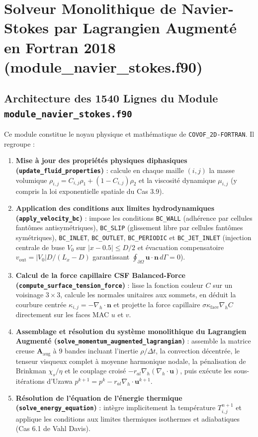 \documentclass[10pt,a4paper,oneside]{book}
\begin{document}
\chapter{Solveur Monolithique de Navier-Stokes par Lagrangien Augmenté en Fortran 2018 (module_navier_stokes.f90)}
\section{Architecture des 1540 Lignes du Module \texttt{module\_navier\_stokes.f90}}
Ce module constitue le noyau physique et mathématique de \texttt{COVOF\_2D-FORTRAN}. Il regroupe :
\begin{enumerate}
  \item \textbf{Mise à jour des propriétés physiques diphasiques (\texttt{update\_fluid\_properties})} : calcule en chaque maille $(i, j)$ la masse volumique $\rho_{i,j} = C_{i,j}\rho_1 + (1-C_{i,j})\rho_2$ et la viscosité dynamique $\mu_{i,j}$ (y compris la loi exponentielle spatiale du Cas 3.9).
  \item \textbf{Application des conditions aux limites hydrodynamiques (\texttt{apply\_velocity\_bc})} : impose les conditions \texttt{BC\_WALL} (adhérence par cellules fantômes antisymétriques), \texttt{BC\_SLIP} (glissement libre par cellules fantômes symétriques), \texttt{BC\_INLET}, \texttt{BC\_OUTLET}, \texttt{BC\_PERIODIC} et \texttt{BC\_JET\_INLET} (injection centrale de buse $V_0$ sur $|x - 0.5| \le D/2$ et évacuation compensatoire $v_{\text{out}} = |V_0| D / (L_x - D)$ garantissant $\oint_{\partial\Omega} \mathbf{u}\cdot\mathbf{n}\,d\Gamma = 0$).
  \item \textbf{Calcul de la force capillaire CSF Balanced-Force (\texttt{compute\_surface\_tension\_force})} : lisse la fonction couleur $C$ sur un voisinage $3\times 3$, calcule les normales unitaires aux sommets, en déduit la courbure centrée $\kappa_{i,j} = -\nabla_h \cdot \mathbf{n}$ et projette la force capillaire $\sigma \kappa_{\text{face}} \nabla_h C$ directement sur les faces MAC $u$ et $v$.
  \item \textbf{Assemblage et résolution du système monolithique du Lagrangien Augmenté (\texttt{solve\_momentum\_augmented\_lagrangian})} : assemble la matrice creuse $\mathbf{A}_{\text{aug}}$ à 9 bandes incluant l'inertie $\rho/\Delta t$, la convection décentrée, le tenseur visqueux complet à moyenne harmonique nodale, la pénalisation de Brinkman $\chi_s/\eta$ et le couplage croisé $-r_{al}\nabla_h(\nabla_h\cdot\mathbf{u})$, puis exécute les sous-itérations d'Uzawa $p^{k+1} = p^k - r_{al}\nabla_h\cdot\mathbf{u}^{k+1}$.
  \item \textbf{Résolution de l'équation de l'énergie thermique (\texttt{solve\_energy\_equation})} : intègre implicitement la température $T_{i,j}^{n+1}$ et applique les conditions aux limites thermiques isothermes et adiabatiques (Cas 6.1 de Vahl Davis).
\end{enumerate}
\end{document}
